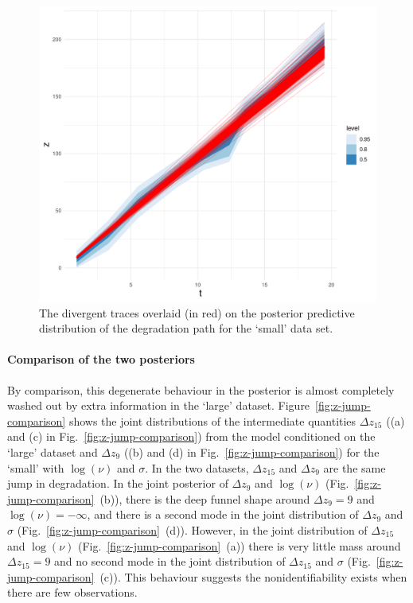 \begin{figure}[tbp]
  \centering
  \includegraphics[width=0.95\columnwidth]{./figures/ch-4/zppd-divergencies.pdf}
  \caption{The divergent traces overlaid (in red) on the posterior predictive distribution of the degradation path for the `small' data set.}
  \label{fig:z-ppd-divergent}
\end{figure}

\paragraph*{Comparison of the two posteriors}
By comparison, this degenerate behaviour in the posterior is almost completely washed out by extra information in the `large' dataset. Figure~\ref{fig:z-jump-comparison} shows the joint distributions of the intermediate quantities $\Delta z_{15}$ ((a) and (c) in Fig.~\ref{fig:z-jump-comparison}) from the model conditioned on the `large' dataset and $\Delta z_{9}$ ((b) and (d) in Fig.~\ref{fig:z-jump-comparison}) for the `small' with $\log(\nu)$ and $\sigma$. In the two datasets, $\Delta z_{15}$ and $\Delta z_{9}$ are the same jump in degradation. In the joint posterior of $\Delta z_{9}$ and $\log(\nu)$ (Fig.~\ref{fig:z-jump-comparison}~(b)), there is the deep funnel shape around $\Delta z_{9} = 9$ and $\log(\nu) = -\infty$, and there is a second mode in the joint distribution of $\Delta z_{9}$ and $\sigma$ (Fig.~\ref{fig:z-jump-comparison}~(d)). However, in the joint distribution of $\Delta z_{15}$ and $\log(\nu)$ (Fig.~\ref{fig:z-jump-comparison}~(a)) there is very little mass around $\Delta z_{15} = 9$ and no second mode in the joint distribution of $\Delta z_{15}$ and $\sigma$ (Fig.~\ref{fig:z-jump-comparison}~(c)). This behaviour suggests the nonidentifiability exists when there are few observations.

